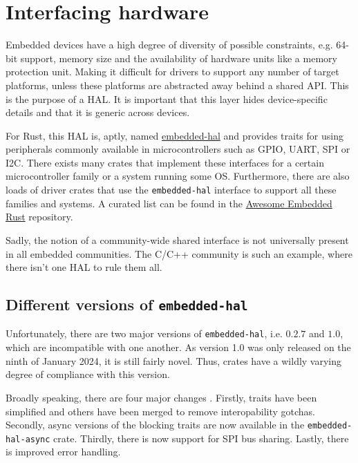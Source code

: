 \chapter{Interfacing hardware}
\label{chap:hardware}

Embedded devices have a high degree of diversity of possible constraints, e.g. 64-bit support, memory size and the availability of hardware units like a memory protection unit. Making it difficult for drivers to support any number of target platforms, unless these platforms are abstracted away behind a shared API. This is the purpose of a \gls{HAL}. It is important that this layer hides device-specific details and that it is generic across devices. 

For Rust, this \gls{HAL} is, aptly, named \href{https://github.com/rust-embedded/embedded-hal}{embedded-hal} and provides traits for using peripherals commonly available in microcontrollers such as \gls{GPIO}, \gls{UART}, \gls{SPI} or \gls{I2C}. There exists many crates that implement these interfaces for a certain microcontroller family or a system running some \gls{OS}. Furthermore, there are also loads of driver crates that use the \texttt{embedded-hal} interface to support all these families and systems. A curated list can be found in the \href{https://github.com/rust-embedded/awesome-embedded-rust}{Awesome Embedded Rust} repository.

Sadly, the notion of a community-wide shared interface is not universally present in all embedded communities. The C/C++ community is such an example, where there isn't one \gls{HAL} to rule them all.

\section{Different versions of \texttt{embedded-hal}}

Unfortunately, there are two major versions of \texttt{embedded-hal}, i.e. $0.2.7$ and $1.0$, which are incompatible with one another. 
As version 1.0 was only released on the ninth of January 2024, it is still fairly novel. Thus, crates have a wildly varying degree of compliance with this version. 

Broadly speaking, there are four major changes \cite{hal:1}. Firstly, traits have been simplified and others have been merged to remove interopability gotchas. 
Secondly, async versions of the blocking traits are now available in the \texttt{embedded-hal-async} crate. Thirdly, there is now support for \gls{SPI} bus sharing. Lastly, there is improved error handling.

